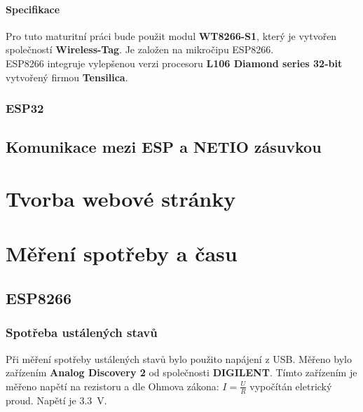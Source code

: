 \documentclass[a4paper, 12pt]{report}
\begin{document}
				\subsubsection{Specifikace}
					Pro tuto maturitní práci bude použit modul \textbf{WT8266-S1}, který je vytvořen společností \textbf{Wireless-Tag}. Je založen na mikročipu ESP8266.\\
					ESP8266 integruje vylepšenou verzi procesoru \textbf{L106 Diamond series 32-bit} vytvořený firmou \textbf{Tensilica}.

			\subsection{ESP32}
		\section{Komunikace mezi ESP a NETIO zásuvkou}

	\chapter{Tvorba webové stránky}
	\chapter{Měření spotřeby a času}
		\section{ESP8266}

			\subsection{Spotřeba ustálených stavů}
				Při měření spotřeby ustálených stavů bylo použito napájení z USB. Měřeno bylo zařízením \textbf{Analog Discovery 2} od společnosti \textbf{DIGILENT}. Tímto zařízením je měřeno napětí na rezistoru a dle Ohmova zákona: $I =\frac{U}{R}$ vypočítán eletrický proud. Napětí je \SI{3.3}{V}.
\end{document}
